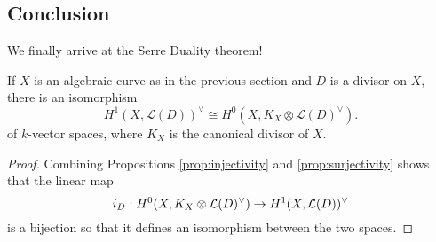 \subsection{Conclusion}
We finally arrive at the Serre Duality theorem!
\begin{thm}
  If $X$ is an algebraic curve as in the previous section
  and $D$ is a divisor on $X$, there is an isomorphism
  \[
    H^{1}(X, \mathcal{L}(D))^{\vee}\cong H^{0}(X, K_{X}
    \otimes \mathcal{L}(D)^{\vee}).
  \]
  of $k$-vector spaces, where $K_{X}$ is the canonical divisor of $X$.
\end{thm}
\begin{proof}
  Combining Propositions \ref{prop:injectivity} and \ref{prop:surjectivity}
  shows that the linear map
  \[i_{D}:H^0(X,K_X\otimes\mathcal{L}(D)^{\vee})\to H^1(X,\mathcal{L}(D))^{\vee}\]
  is a bijection so that it defines an isomorphism between the two spaces.
\end{proof}
